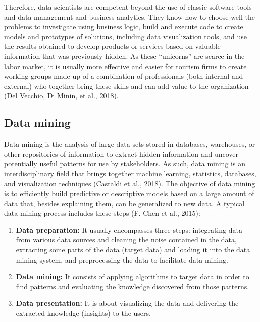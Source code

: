 \documentclass[
  letterpaper,
  DIV=11,
  numbers=noendperiod]{scrreprt}
\begin{document}
Therefore, data scientists are competent beyond the use of classic
software tools and data management and business analytics. They know how
to choose well the problems to investigate using business logic, build
and execute code to create models and prototypes of solutions, including
data visualization tools, and use the results obtained to develop
products or services based on valuable information that was previously
hidden. As these ``unicorns'' are scarce in the labor market, it is
usually more effective and easier for tourism firms to create working
groups made up of a combination of professionals (both internal and
external) who together bring these skills and can add value to the
organization (Del Vecchio, Di Minin, et al., 2018).

\hypertarget{data-mining}{%
\subsection{Data mining}\label{data-mining}}

Data mining is the analysis of large data sets stored in databases,
warehouses, or other repositories of information to extract hidden
information and uncover potentially useful patterns for use by
stakeholders. As such, data mining is an interdisciplinary field that
brings together machine learning, statistics, databases, and
visualization techniques (Castaldi et al., 2018). The objective of data
mining is to efficiently build predictive or descriptive models based on
a large amount of data that, besides explaining them, can be generalized
to new data. A typical data mining process includes these steps (F. Chen
et al., 2015):

\begin{enumerate}
\def\labelenumi{\arabic{enumi}.}
\item
  \textbf{Data preparation:} It usually encompasses three steps:
  integrating data from various data sources and cleaning the noise
  contained in the data, extracting some parts of the data (target data)
  and loading it into the data mining system, and preprocessing the data
  to facilitate data mining.
\item
  \textbf{Data mining:} It consists of applying algorithms to target
  data in order to find patterns and evaluating the knowledge discovered
  from those patterns.
\item
  \textbf{Data presentation:} It is about visualizing the data and
  delivering the extracted knowledge (insights) to the users.
\end{enumerate}
\end{document}
